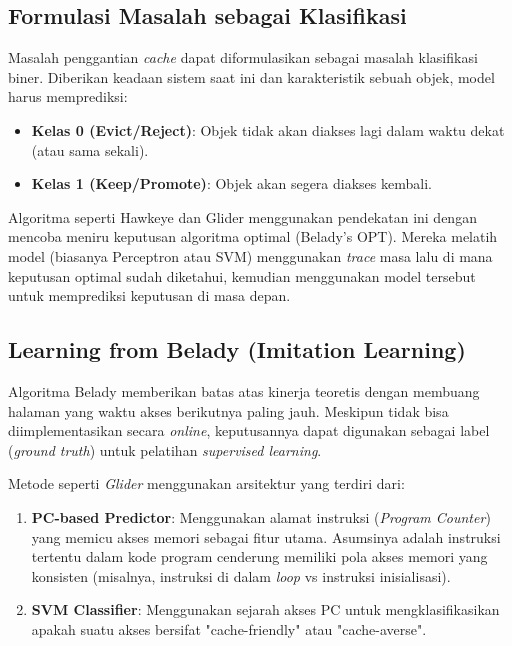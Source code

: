 \subsection{Formulasi Masalah sebagai Klasifikasi}
Masalah penggantian \textit{cache} dapat diformulasikan sebagai masalah
klasifikasi biner. Diberikan keadaan sistem saat ini dan karakteristik
sebuah objek, model harus memprediksi:
\begin{itemize}
  \item \textbf{Kelas 0 (Evict/Reject)}: Objek tidak akan diakses lagi
    dalam waktu dekat (atau sama sekali).
  \item \textbf{Kelas 1 (Keep/Promote)}: Objek akan segera diakses kembali.
\end{itemize}
Algoritma seperti Hawkeye dan Glider menggunakan pendekatan ini dengan
mencoba meniru keputusan algoritma optimal (Belady's OPT). Mereka melatih
model (biasanya Perceptron atau SVM) menggunakan \textit{trace} masa lalu
di mana keputusan optimal sudah diketahui, kemudian menggunakan model
tersebut untuk memprediksi keputusan di masa depan.

\subsection{Learning from Belady (Imitation Learning)}
Algoritma Belady memberikan batas atas kinerja teoretis dengan membuang
halaman yang waktu akses berikutnya paling jauh. Meskipun tidak bisa
diimplementasikan secara \textit{online}, keputusannya dapat digunakan
sebagai label (\textit{ground truth}) untuk pelatihan
\textit{supervised learning}.

Metode seperti \textit{Glider} menggunakan arsitektur yang terdiri dari:
\begin{enumerate}
  \item \textbf{PC-based Predictor}: Menggunakan alamat instruksi
    (\textit{Program Counter}) yang memicu akses memori sebagai fitur utama.
    Asumsinya adalah instruksi tertentu dalam kode program cenderung memiliki
    pola akses memori yang konsisten (misalnya, instruksi di dalam
    \textit{loop} vs instruksi inisialisasi).
  \item \textbf{SVM Classifier}: Menggunakan sejarah akses PC untuk
    mengklasifikasikan apakah suatu akses bersifat "cache-friendly"
    atau "cache-averse".
\end{enumerate}

